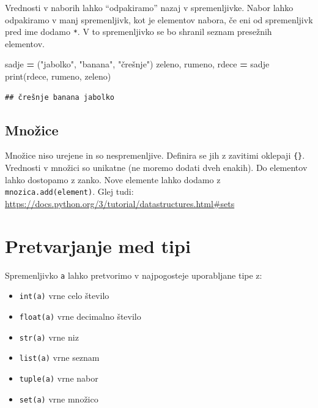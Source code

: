 \documentclass[
]{book}
\newenvironment{Shaded}{\begin{snugshade}}{\end{snugshade}}
\newcommand{\BuiltInTok}[1]{#1}
\newcommand{\NormalTok}[1]{#1}
\newcommand{\OperatorTok}[1]{\textcolor[rgb]{0.81,0.36,0.00}{\textbf{#1}}}
\newcommand{\StringTok}[1]{\textcolor[rgb]{0.31,0.60,0.02}{#1}}
\providecommand{\tightlist}{%
  \setlength{\itemsep}{0pt}\setlength{\parskip}{0pt}}
\begin{document}
Vrednosti v naborih lahko ``odpakiramo'' nazaj v spremenljivke. Nabor lahko odpakiramo v manj spremenljivk, kot je elementov nabora, če eni od spremenljivk pred ime dodamo \texttt{*}. V to spremenljivko se bo shranil seznam presežnih elementov.

\begin{Shaded}
\begin{Highlighting}[]
\NormalTok{sadje }\OperatorTok{=}\NormalTok{ (}\StringTok{"jabolko"}\NormalTok{, }\StringTok{"banana"}\NormalTok{, }\StringTok{"črešnje"}\NormalTok{)}
\NormalTok{zeleno, rumeno, rdece }\OperatorTok{=}\NormalTok{ sadje}
\BuiltInTok{print}\NormalTok{(rdece, rumeno, zeleno)}
\end{Highlighting}
\end{Shaded}

\begin{verbatim}
## črešnje banana jabolko
\end{verbatim}

\hypertarget{mnoux17eice}{%
\subsection{Množice}\label{mnoux17eice}}

Množice niso urejene in so nespremenljive. Definira se jih z zavitimi oklepaji \texttt{\{\}}. Vrednosti v množici so unikatne (ne moremo dodati dveh enakih). Do elementov lahko dostopamo z zanko. Nove elemente lahko dodamo z \texttt{mnozica.add(element)}. Glej tudi: \url{https://docs.python.org/3/tutorial/datastructures.html\#sets}

\hypertarget{pretvarjanje-med-tipi}{%
\section{Pretvarjanje med tipi}\label{pretvarjanje-med-tipi}}

Spremenljivko \texttt{a} lahko pretvorimo v najpogosteje uporabljane tipe z:

\begin{itemize}
\tightlist
\item
  \texttt{int(a)} vrne celo število
\item
  \texttt{float(a)} vrne decimalno število
\item
  \texttt{str(a)} vrne niz
\item
  \texttt{list(a)} vrne seznam
\item
  \texttt{tuple(a)} vrne nabor
\item
  \texttt{set(a)} vrne množico
\end{itemize}
\end{document}
